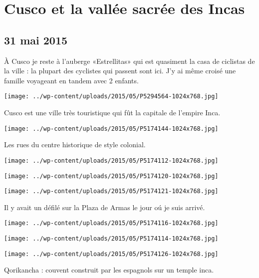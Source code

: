 \chapter{Cusco et la vallée sacrée des Incas}
\section*{31 mai 2015}
À Cusco je reste à l'auberge «Estrellitas» qui est quasiment la casa de ciclistas de la ville : la plupart des cyclistes qui passent sont ici. J'y ai même croisé une famille voyageant en tandem avec 2 enfants. \newline
 \newline
\centerline{\texttt{[image: ../wp-content/uploads/2015/05/P5294564-1024x768.jpg]} } 
 \newline
 Cusco est une ville très touristique qui fût la capitale de l'empire Inca. \newline
 \newline
\centerline{\texttt{[image: ../wp-content/uploads/2015/05/P5174144-1024x768.jpg]} } 
 \newline
 Les rues du centre historique de style colonial. \newline
 \newline
\centerline{\texttt{[image: ../wp-content/uploads/2015/05/P5174112-1024x768.jpg]} } 
 \newline
 \newline
\centerline{\texttt{[image: ../wp-content/uploads/2015/05/P5174120-1024x768.jpg]} } 
 \newline
 \newline
\centerline{\texttt{[image: ../wp-content/uploads/2015/05/P5174121-1024x768.jpg]} } 
 \newline
 Il y avait un défilé sur la Plaza de Armas le jour oú je suis arrivé. \newline
 \newline
\centerline{\texttt{[image: ../wp-content/uploads/2015/05/P5174116-1024x768.jpg]} } 
 \newline
 \newline
\centerline{\texttt{[image: ../wp-content/uploads/2015/05/P5174114-1024x768.jpg]} } 
 \newline
 \newline
\centerline{\texttt{[image: ../wp-content/uploads/2015/05/P5174126-1024x768.jpg]} } 
 \newline
 Qorikancha : couvent construit par les espagnols sur un temple inca. \newline
